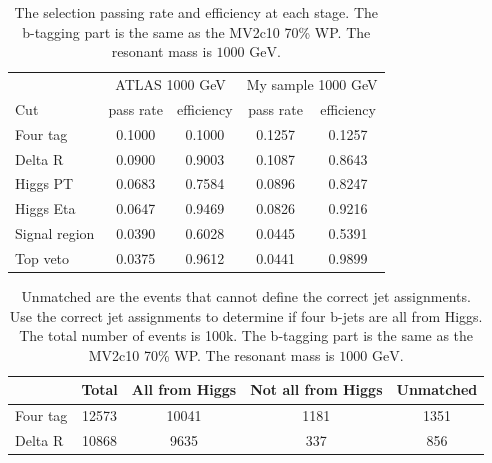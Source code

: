 \documentclass[12pt]{article}
\begin{document}
			\begin{table}[htpb]
				\centering
				\caption{The selection passing rate and efficiency at each stage. The b-tagging part is the same as the MV2c10 70\% WP. The resonant mass is $\text{1000 GeV}$.}
				\label{tab:signal_selection_efficiency_1000GeV_MV2c10}
				\begin{tabular}{l|cc|cc}
								  & \multicolumn{2}{|c|}{ATLAS 1000 GeV} & \multicolumn{2}{|c}{My sample 1000 GeV} \\
					Cut           & pass rate       & efficiency       & pass rate         & efficiency         \\ \hline
					Four tag      & 0.1000 & 0.1000 & 0.1257 & 0.1257 \\
					Delta R       & 0.0900 & 0.9003 & 0.1087 & 0.8643 \\
					Higgs PT      & 0.0683 & 0.7584 & 0.0896 & 0.8247 \\
					Higgs Eta     & 0.0647 & 0.9469 & 0.0826 & 0.9216 \\
					Signal region & 0.0390 & 0.6028 & 0.0445 & 0.5391 \\
					Top veto      & 0.0375 & 0.9612 & 0.0441 & 0.9899
				\end{tabular}
			\end{table}

			\begin{table}[htpb]
				\centering
				\caption{Unmatched are the events that cannot define the correct jet assignments. Use the correct jet assignments to determine if four b-jets are all from Higgs. The total number of events is 100k. The b-tagging part is the same as the MV2c10 70\% WP. The resonant mass is $\text{1000 GeV}$.}
				\label{tab:signal_selection_compared_with_truth_matching_1000GeV_MV2c10}
				\begin{tabular}{l|c|ccc}
							 & Total & All from Higgs & Not all from Higgs & Unmatched \\ \hline
					Four tag & 12573 & 10041    & 1181  & 1351   \\
					Delta R  & 10868 & 9635    & 337   & 856    
				\end{tabular}
			\end{table}

\end{document}
